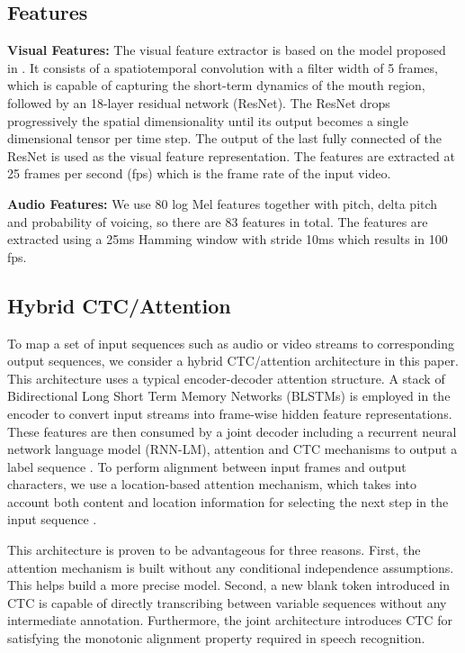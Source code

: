 \documentclass{article}
\begin{document}
\subsection{Features}

\textbf{Visual Features:}
The visual feature extractor is based on the model proposed in \cite{stafylakis2017combining}.
It consists of a spatiotemporal convolution with a filter width of 5 frames, which is capable
of capturing the short-term dynamics of the mouth region, followed by an 18-layer residual network (ResNet).
The ResNet drops progressively the spatial dimensionality until its output becomes a single dimensional tensor per time step. 
The output of the last fully connected of the ResNet is used as the visual feature representation. The features are extracted at 25 frames per second (fps) which is the frame rate of the input video.

\textbf{Audio Features:} We use 80 log Mel features together with pitch, delta pitch and probability of voicing, so there are 83 features in total. The features are extracted using a 25ms Hamming window with stride 10ms which results in 100 fps.

\subsection{Hybrid CTC/Attention}
\label{sec:typestyle}
To map a set of input sequences such as audio or video streams to corresponding output sequences, we consider a hybrid CTC/attention architecture \cite{watanabe2017hybrid} in this paper. This architecture uses a typical encoder-decoder attention structure. A stack of Bidirectional Long Short Term Memory Networks (BLSTMs)   is employed in the encoder to convert input streams  into frame-wise hidden feature representations. These features are then consumed by a joint decoder including a recurrent neural network language model (RNN-LM), attention and CTC mechanisms to output a label sequence . To perform alignment between input frames and output characters, we use a location-based attention mechanism, which takes into account both content and location information for selecting the next step in the input sequence \cite{chorowski2015attention}.

This architecture is proven to be advantageous for three reasons. First, the attention mechanism is built without any conditional independence assumptions. This helps build a more precise model. Second, a new blank token introduced in CTC is capable of directly transcribing between variable sequences without any intermediate annotation. Furthermore, the joint architecture introduces CTC for satisfying the monotonic alignment property required in speech recognition. 
\end{document}

